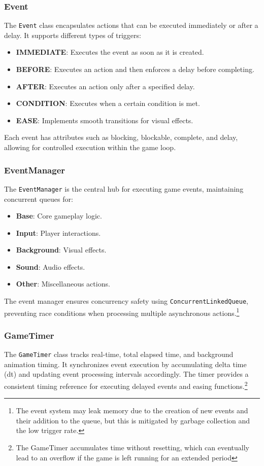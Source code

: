 \documentclass[conference]{IEEEtran}
\begin{document}
\subsubsection{Event}
The \texttt{Event} class encapsulates actions that can be executed immediately
or after a delay. It supports different types of triggers:
\begin{itemize}
    \item \textbf{IMMEDIATE}: Executes the event as soon as it is created.
    \item \textbf{BEFORE}: Executes an action and then enforces a delay before completing.
    \item \textbf{AFTER}: Executes an action only after a specified delay.
    \item \textbf{CONDITION}: Executes when a certain condition is met.
    \item \textbf{EASE}: Implements smooth transitions for visual effects.
\end{itemize}
Each event has attributes such as blocking, blockable, complete, and delay, allowing for controlled execution within the game loop.

\subsubsection{EventManager}
The \texttt{EventManager} is the central hub for executing game events,
maintaining concurrent queues for:
\begin{itemize}
    \item \textbf{Base}: Core gameplay logic.
    \item \textbf{Input}: Player interactions.
    \item \textbf{Background}: Visual effects.
    \item \textbf{Sound}: Audio effects.
    \item \textbf{Other}: Miscellaneous actions.
\end{itemize}
The event manager ensures concurrency safety using \texttt{ConcurrentLinkedQueue}\cite{oracle:concurrentlinkedqueue,stackoverflow:concurrentlinkedqueue},
preventing race conditions when processing multiple asynchronous actions.\footnote{The event system may leak memory due to the creation of new events and their addition to the queue, but this is mitigated by garbage collection and the low trigger rate.}

\subsubsection{GameTimer}
The \texttt{GameTimer} class tracks real-time, total elapsed time, and
background animation timing. It synchronizes event execution by accumulating
delta time (dt) and updating event processing intervals accordingly. The timer
provides a consistent timing reference for executing delayed events and easing
functions.\footnote{The GameTimer accumulates time without resetting, which can
    eventually lead to an overflow if the game is left running for an extended
    period}
\end{document}
